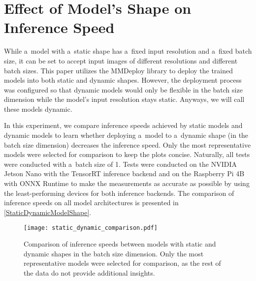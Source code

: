 





\section{Effect of Model's Shape on Inference Speed}

While a~model with a~static shape has a~fixed input resolution and a~fixed batch
size, it can be set to accept input images of different resolutions and
different batch sizes. This paper utilizes the MMDeploy library to deploy the
trained models into both static and dynamic shapes. However, the deployment
process was configured so that dynamic models would only be flexible in the
batch size dimension while the model's input resolution stays static. Anyways,
we will call these models dynamic.

In this experiment, we compare inference speeds achieved by static models and
dynamic models to learn whether deploying a~model to a~dynamic shape (in the
batch size dimension) decreases the inference speed. Only the most
representative models were selected for comparison to keep the plots concise.
Naturally, all tests were conducted with a~batch size of 1. Tests
were conducted on the NVIDIA Jetson Nano with the TensorRT inference backend and
on the Raspberry Pi 4B with ONNX Runtime to make the measurements as accurate as
possible by using the least-performing devices for both inference backends. The
comparison of inference speeds on all model architectures is presented in
\autoref{StaticDynamicModelShape}.

\begin{figure}[t]
        \centering
        \texttt{[image: static\_dynamic\_comparison.pdf]}
        \caption{Comparison of inference speeds between models with static and
        dynamic shapes in the batch size dimension. Only the most representative
        models were selected for comparison, as the rest of the data do not
        provide additional insights.}
        \label{StaticDynamicModelShape}
\end{figure}

